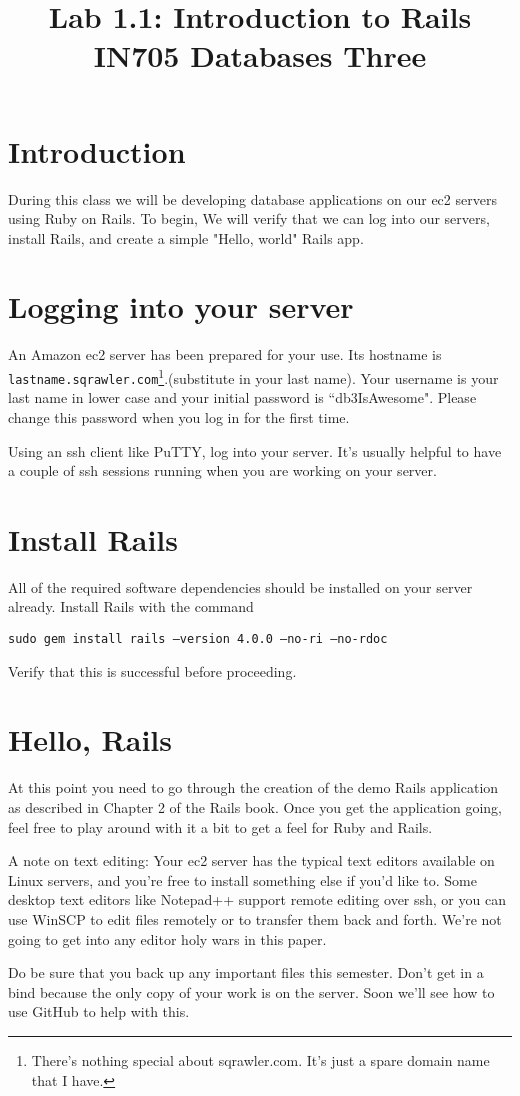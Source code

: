 \documentclass{article}
\begin{document}
\title{Lab 1.1: Introduction to Rails \\ IN705 Databases Three}
\date{}
\maketitle

\section*{Introduction}
During this class we will be developing database applications on our ec2 servers using Ruby on Rails.  To begin,
We will verify that we can log into our servers, install Rails, and create a simple "Hello, world" Rails app.

\section{Logging into your server}
An Amazon ec2 server has been prepared for your use.  Its hostname is \texttt{lastname.sqrawler.com}\footnote{There's nothing special about sqrawler.com. It's just a spare domain name that I have.}.(substitute in your last name).  Your username is your last name in lower case and your initial password is ``db3IsAwesome".  Please change this password when you log in for the first time.

Using an ssh client like PuTTY, log into your server.  It's usually helpful to have a couple of ssh sessions running when you are working on your server.


\section{Install Rails}
All of the required software dependencies should be installed on your server already.  Install Rails with the command

\texttt{sudo gem install rails --version 4.0.0 --no-ri --no-rdoc}

Verify that this is successful before proceeding.

\section{Hello, Rails}
At this point you need to go through the creation of the demo Rails application as described in Chapter 2 of the Rails book.  Once you get the application going, feel free to play around with it a bit to get a feel for Ruby and Rails.

A note on text editing:  Your ec2 server has the typical text editors available on Linux servers, and you're free to install something else if you'd like to.  Some desktop text editors like Notepad++ support remote editing over ssh, or you can use WinSCP to edit files remotely or to transfer them back and forth.  We're not going to get into any editor holy wars in this paper.

Do be sure that you back up any important files this semester.  Don't get in a bind because the only copy of your work is on the server.  Soon we'll see how to use GitHub to help with this.
\end{document}
